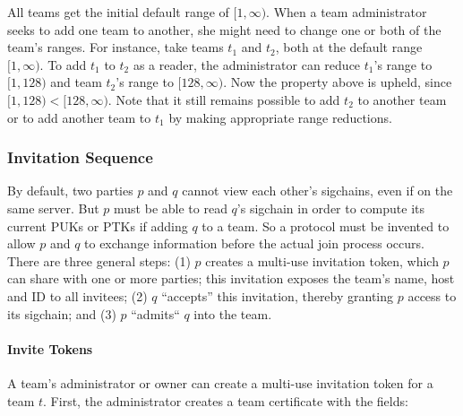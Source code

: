 All teams get the initial default range of $[1,\infty)$. When a team administrator
seeks to add one team to another, she might need to change one or both of the team's
ranges. For instance, take teams $t_1$ and $t_2$, both at the default range $[1,\infty)$.
To add $t_1$ to $t_2$ as a reader, the administrator can reduce $t_1$'s range to $[1, 128)$
and team $t_2$'s range to $[128, \infty)$. Now the property above is upheld,
since $[1,128) < [128, \infty)$.  Note that it still remains possible to add $t_2$ to 
another team or to add another team to $t_1$ by making appropriate range reductions.

\subsubsection{Invitation Sequence}

By default, two parties $p$ and $q$ cannot view each other's sigchains, even if on the same
server. But $p$ must be able to read $q$'s sigchain in order to compute its current
PUKs or PTKs if adding $q$ to a team. So a protocol must be invented to allow $p$ and $q$
to exchange information before the actual join process occurs. There are three general
steps: (1) $p$ creates a multi-use invitation token, which $p$ can share with one or
more parties; this invitation exposes the team's name, host and ID to all invitees; 
(2) $q$ ``accepts'' this invitation, thereby granting $p$ access to its sigchain;
and (3) $p$ ``admits`` $q$ into the team.

\paragraph{Invite Tokens}

A team's administrator or owner can create a multi-use invitation token for a team $t$.
First, the administrator creates a team certificate with the fields:

